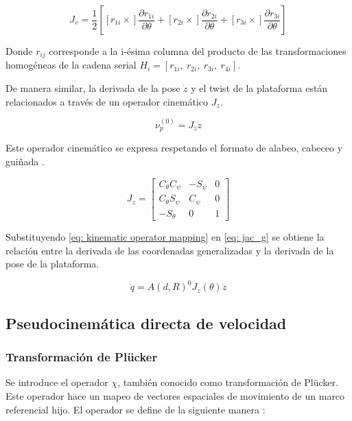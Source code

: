 \begin{equation}
 J_v = \dfrac{1}{2} [[r_{1i}\times] \dfrac{\partial r_{1i}}{\partial \theta} +[r_{2i}\times] \dfrac{\partial r_{2i}}{\partial \theta}+[r_{3i}\times] \dfrac{\partial r_{3i}}{\partial \theta}]
\end{equation}

Donde $r_{ij}$ corresponde a la 
i-ésima columna del producto de 
las transformaciones homogéneas
de la cadena serial 
$H_i = [r_{1i}, \ r_{2i},\ r_{3i},\ r_{4i}]$.

De manera similar, la derivada de la pose $\dot z$
y el twist de la plataforma están relacionados 
a través de un operador cinemático $J_z$.

\begin{equation}\label{eq: kinematic operator mapping}
\nu_p^{(0)} = J_z\dot{z}
\end{equation}

Este operador cinemático se expresa respetando 
el formato de alabeo, cabeceo y guiñada \cite{olguin20183d}.

\begin{equation}\label{eq: kinematic operator}
 J_z = \begin{bmatrix}
        C_\theta C_\psi & -S_\psi & 0\\
        C_\theta S_\psi & C_\psi & 0\\
        -S_\theta & 0 & 1
       \end{bmatrix}
\end{equation}

Substituyendo \eqref{eq: kinematic operator mapping}
en \eqref{eq: jac_g} se obtiene la relación entre
la derivada de las coordenadas generalizadas y 
la derivada de la pose de la plataforma.

\begin{equation} \label{eq: q_twist}
\dot{q} = A(d,R)^0J_z(\theta) \dot{z}
\end{equation}

\subsection{Pseudocinemática directa de velocidad}

\subsubsection{Transformación de Plücker}

Se introduce el operador $\chi$, 
también conocido como transformación de Plücker.
Este operador hace un mapeo de vectores 
espaciales de movimiento de un marco referencial hijo.
El operador se define de la siguiente manera \cite{olguin20183d}:

